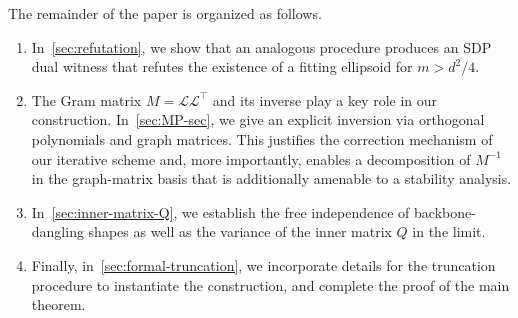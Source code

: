 \documentclass[12pt]{article}
\newcommand{\calL}{\mathcal{L}}
\begin{document}
The remainder of the paper is organized as follows.

\begin{enumerate}
	\item In~\cref{sec:refutation}, we show that an analogous procedure produces an SDP dual witness that refutes the existence of a fitting ellipsoid for $m>d^2/4$.
	\item The Gram matrix $M=\calL\calL^\top$ and its inverse play a key role in our construction. In~\cref{sec:MP-sec}, we give an explicit inversion via orthogonal polynomials and graph matrices.
This justifies the correction mechanism of our iterative scheme and, more importantly, enables a decomposition of $M^{-1}$ in the graph-matrix basis that is additionally amenable to a stability analysis.  \item In~\cref{sec:inner-matrix-Q}, we establish the free independence of backbone-dangling shapes as well as the variance of the inner matrix $Q$ in the limit.
\item Finally, in~\cref{sec:formal-truncation}, we incorporate details for the truncation procedure to instantiate the construction,
    and complete the proof of the main theorem.
\end{enumerate} 
%
\end{document}
